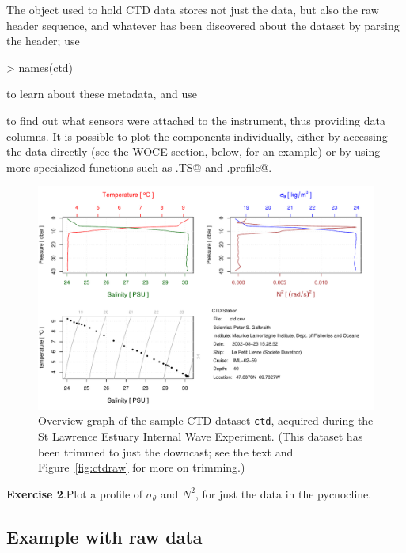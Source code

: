 \documentclass{article}
\newcommand{\workedexercise}[2]{
	\vspace{1ex}
	\begin{boxedminipage}[c]{0.95\linewidth}
		{\textbf{Exercise #1}.\hspace{1em}#2}
	\end{boxedminipage}
	\vspace{1ex}
}
\begin{document}
The object used to hold CTD data stores not just the data, but also the raw header sequence,
and whatever has been discovered about the dataset by parsing the header; use
\begin{Schunk}
\begin{Sinput}
> names(ctd)
\end{Sinput}
\end{Schunk}
to learn about these metadata, and use
\begin{Schunk}
\end{Schunk}
to find out what sensors were attached to the instrument, thus providing data columns. It is
possible to plot the components individually, either by accessing the data directly (see the
WOCE section, below, for an example) or by using more specialized functions such as
\verb@plot.TS@ and \verb@plot.profile@.
\begin{figure}
\begin{center}
\includegraphics{oce-ctdfig}
\end{center}
\caption{Overview graph of the sample CTD dataset \texttt{ctd}, acquired during the St Lawrence Estuary Internal Wave Experiment.  (This dataset has been trimmed to just the downcast; see the text and Figure~\ref{fig:ctdraw} for more on trimming.)}
\label{fig:ctd}
\end{figure}

\workedexercise{2}{Plot a profile of $\sigma_\theta$ and $N^2$, for just the data in the pycnocline.}

\subsection{Example with raw data}
\end{document}
